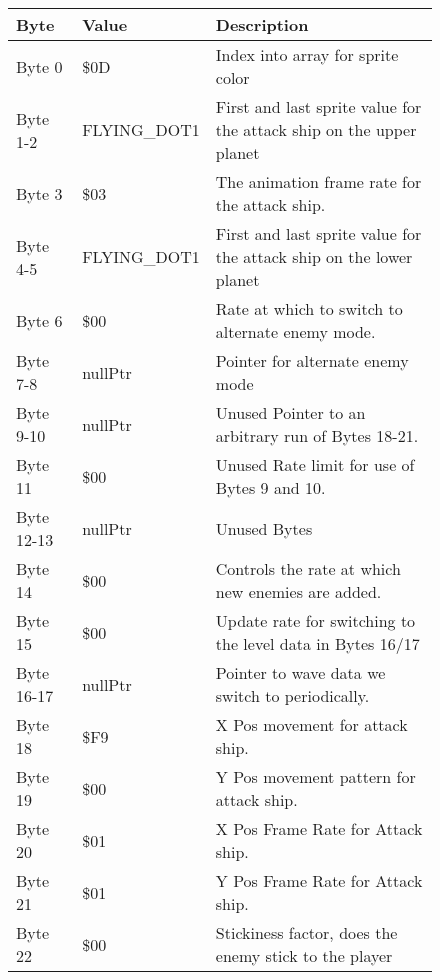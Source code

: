 \begin{figure}[H]
{\begin{adjustbox}{width=12cm}
\begin{tabular}{lll}
\toprule
 Byte       & Value             & Description                                                         \\
\midrule
 Byte 0     & \$0D               & Index into array for sprite color                                   \\
 Byte 1-2   & FLYING\_DOT1       & First and last sprite value for the attack ship on the upper planet \\
 Byte 3     & \$03               & The animation frame rate for the attack ship.                       \\
 Byte 4-5   & FLYING\_DOT1       & First and last sprite value for the attack ship on the lower planet \\
 Byte 6     & \$00               & Rate at which to switch to alternate enemy mode.                    \\
 Byte 7-8   & nullPtr           & Pointer for alternate enemy mode                                    \\
 Byte 9-10  & nullPtr           & Unused Pointer to an arbitrary run of Bytes 18-21.                  \\
 Byte 11    & \$00               & Unused Rate limit for use of Bytes 9 and 10.                        \\
 Byte 12-13 & nullPtr           & Unused Bytes                                                        \\
 Byte 14    & \$00               & Controls the rate at which new enemies are added.                   \\
 Byte 15    & \$00               & Update rate for switching to the level data in Bytes 16/17          \\
 Byte 16-17 & nullPtr           & Pointer to wave data we switch to periodically.                     \\
 Byte 18    & \$F9               & X Pos movement for attack ship.                                     \\
 Byte 19    & \$00               & Y Pos movement pattern for attack ship.                             \\
 Byte 20    & \$01               & X Pos Frame Rate for Attack ship.                                   \\
 Byte 21    & \$01               & Y Pos Frame Rate for Attack ship.                                   \\
 Byte 22    & \$00               & Stickiness factor, does the enemy stick to the player               \\

\end{tabular}
\end{adjustbox}}
\end{figure}
